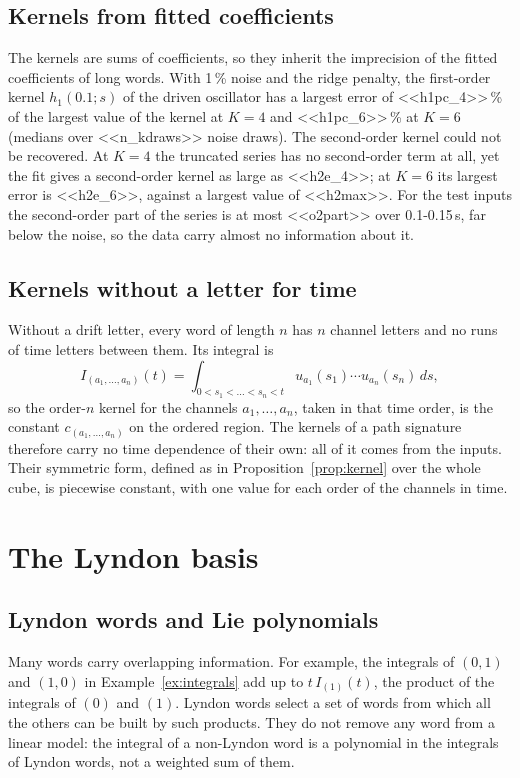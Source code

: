 \documentclass[11pt,a4paper]{article}
\theoremstyle{remark}
\begin{document}
\subsection{Kernels from fitted coefficients}
The kernels are sums of coefficients, so they inherit the imprecision of the fitted coefficients of long words.
With 1\,\% noise and the ridge penalty, the first-order kernel $h_1(0.1;s)$ of the driven oscillator has a largest error of <<h1pc_4>>\,\% of the largest value of the kernel at $K=4$ and <<h1pc_6>>\,\% at $K=6$ (medians over <<n_kdraws>> noise draws).
The second-order kernel could not be recovered.
At $K=4$ the truncated series has no second-order term at all, yet the fit gives a second-order kernel as large as <<h2e_4>>; at $K=6$ its largest error is <<h2e_6>>, against a largest value of <<h2max>>.
For the test inputs the second-order part of the series is at most <<o2part>> over 0.1-0.15\,s, far below the noise, so the data carry almost no information about it.

\subsection{Kernels without a letter for time}
Without a drift letter, every word of length $n$ has $n$ channel letters and no runs of time letters between them.
Its integral is
\[I_{(a_1,\dots,a_n)}(t)=\int_{0<s_1<\dots<s_n<t}u_{a_1}(s_1)\cdots u_{a_n}(s_n)\,ds,\]
so the order-$n$ kernel for the channels $a_1,\dots,a_n$, taken in that time order, is the constant $c_{(a_1,\dots,a_n)}$ on the ordered region.
The kernels of a path signature therefore carry no time dependence of their own: all of it comes from the inputs.
Their symmetric form, defined as in Proposition~\ref{prop:kernel} over the whole cube, is piecewise constant, with one value for each order of the channels in time.

\section{The Lyndon basis}\label{sec:lyndon}
\subsection{Lyndon words and Lie polynomials}
Many words carry overlapping information.
For example, the integrals of $(0,1)$ and $(1,0)$ in Example~\ref{ex:integrals} add up to $t\,I_{(1)}(t)$, the product of the integrals of $(0)$ and $(1)$.
Lyndon words select a set of words from which all the others can be built by such products.
They do not remove any word from a linear model: the integral of a non-Lyndon word is a polynomial in the integrals of Lyndon words, not a weighted sum of them.
\end{document}
